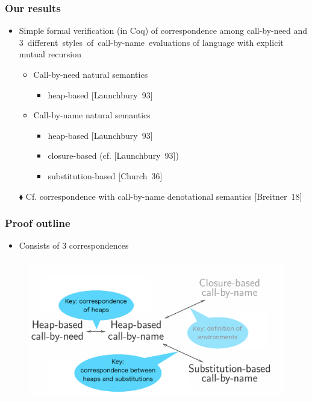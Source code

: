 \documentclass[professionalfont,dvipdfmx,cjk,xcolor=dvipsnames,envcountsect,notheorems,12pt]{beamer}
\theoremstyle{definition}
\begin{document}
\begin{frame}
	\frametitle{Our results}
	\vspace{-5mm}
	\begin{itemize}
		\item \alert{Simple formal verification} (in Coq) of correspondence among call-by-need and \mbox{3 different styles of call-by-name evaluations} of language with \alert{explicit mutual recursion}
			\begin{itemize}
				\pause
				\item Call-by-need natural semantics
					\pause
					\begin{itemize}
						\item heap-based {\small \mbox{[Launchbury 93]}}
					\end{itemize}
				\pause
				\item Call-by-name natural semantics
					\begin{itemize}
						\pause
						\item heap-based {\small \mbox{[Launchbury 93]}}
						\pause
						\item closure-based {\small (cf. \mbox{[Launchbury 93]})}
						\pause
						\item substitution-based {\small \mbox{[Church 36]}}
					\end{itemize}
			\end{itemize}
		\pause
		\item[$\blacklozenge$] Cf. correspondence with call-by-name denotational semantics {\small \mbox{[Breitner 18]}}
	\end{itemize}
\end{frame}

\begin{frame}
	\frametitle{Proof outline}
	\begin{itemize}
		\item Consists of 3 correspondences
	\end{itemize}
	\begin{figure}[b]
		\centering
		\includegraphics[height=62mm]{correspondences.png}
	\end{figure}
\end{frame}
\end{document}
